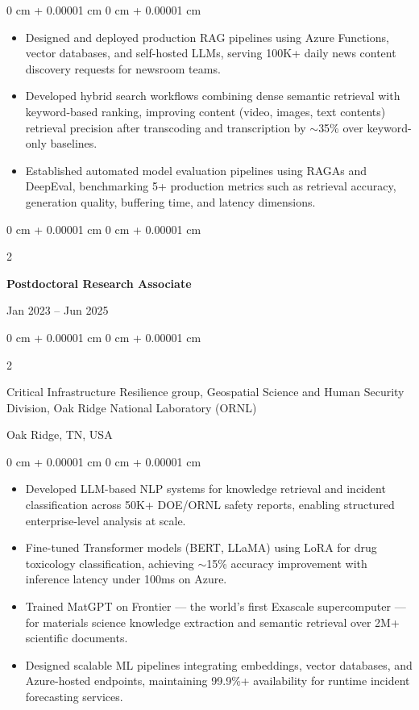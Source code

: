 \documentclass[10pt, letterpaper]{article}
\newenvironment{highlights}{
    \begin{itemize}[
        topsep=0.10 cm,
        parsep=0.10 cm,
        partopsep=0pt,
        itemsep=0pt,
        leftmargin=0 cm + 10pt
    ]
}{
    \end{itemize}
} %
\newenvironment{onecolentry}{
    \begin{adjustwidth}{
        0 cm + 0.00001 cm
    }{
        0 cm + 0.00001 cm
    }
}{
    \end{adjustwidth}
} %
\newenvironment{twocolentry}[2][]{
    \onecolentry
    \def\secondColumn{#2}
    \setcolumnwidth{\fill, 4.5 cm}
    \begin{paracol}{2}
}{
    \switchcolumn \raggedleft \secondColumn
    \end{paracol}
    \endonecolentry
} %
\begin{document}
    \begin{onecolentry}
        \begin{highlights}
            \item Designed and deployed production RAG pipelines using Azure Functions, vector databases, and self-hosted LLMs, serving 100K+ daily news content discovery requests for newsroom teams.
            \item Developed hybrid search workflows combining dense semantic retrieval with keyword-based ranking, improving content (video, images, text contents) retrieval precision after transcoding and transcription by $\sim$35\% over keyword-only baselines.
            \item Established automated model evaluation pipelines using RAGAs and DeepEval, benchmarking 5+ production metrics such as retrieval accuracy, generation quality, buffering time, and latency dimensions.
        \end{highlights}
    \end{onecolentry}

    \vspace{1mm}

    \begin{twocolentry}{Jan 2023 -- Jun 2025}
        \textbf{Postdoctoral Research Associate}
    \end{twocolentry}
    \begin{twocolentry}{Oak Ridge, TN, USA}
        Critical Infrastructure Resilience group, Geospatial Science and Human Security Division, Oak Ridge National Laboratory (ORNL)
    \end{twocolentry}
    \vspace{0.10 cm}
    \begin{onecolentry}
        \begin{highlights}
            \item Developed LLM-based NLP systems for knowledge retrieval and incident classification across 50K+ DOE/ORNL safety reports, enabling structured enterprise-level analysis at scale.
            \item Fine-tuned Transformer models (BERT, LLaMA) using LoRA for drug toxicology classification, achieving $\sim$15\% accuracy improvement with inference latency under 100ms on Azure.
            \item Trained MatGPT on Frontier --- the world's first Exascale supercomputer --- for materials science knowledge extraction and semantic retrieval over 2M+ scientific documents.
            \item Designed scalable ML pipelines integrating embeddings, vector databases, and Azure-hosted endpoints, maintaining 99.9\%+ availability for runtime incident forecasting services.
        \end{highlights}
    \end{onecolentry}
\end{document}
